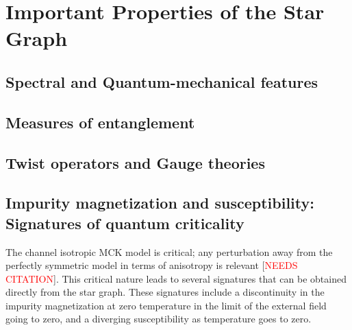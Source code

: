 \documentclass[reprint,prb,superscriptaddress]{revtex4-2}
\begin{document}
\section{Important Properties of the Star Graph}
\subsection{Spectral and Quantum-mechanical features}

\subsection{Measures of entanglement}

\subsection{Twist operators and Gauge theories}

\subsection{Impurity magnetization and susceptibility: Signatures of quantum criticality}
The channel isotropic MCK model is critical; any perturbation away from the perfectly symmetric model in terms of anisotropy is relevant [\textcolor{red}{NEEDS CITATION}]. This critical nature leads to several signatures that can be obtained directly from the star graph. These signatures include a discontinuity in the impurity magnetization at zero temperature in the limit of the external field going to zero, and a diverging susceptibility as temperature goes to zero.
\end{document}
